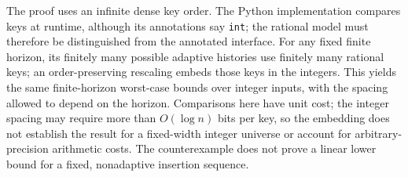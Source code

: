 The proof uses an infinite dense key order. The Python implementation compares
keys at runtime, although its annotations say \texttt{int}; the rational model
must therefore be distinguished from the annotated interface. For any fixed
finite horizon, its finitely many possible adaptive histories use finitely many
rational keys; an order-preserving rescaling embeds those keys in the integers.
This yields the same finite-horizon worst-case bounds over integer inputs, with
the spacing allowed to depend on the horizon. Comparisons here have unit cost;
the integer spacing may require more than $O(\log n)$ bits per key, so the
embedding does not establish the result for a fixed-width integer universe or
account for arbitrary-precision arithmetic costs. The counterexample does not
prove a linear lower bound for a fixed, nonadaptive insertion sequence.
